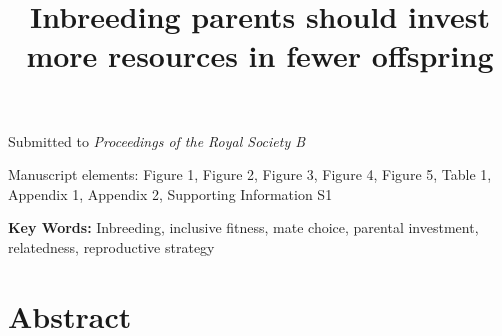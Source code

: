 \documentclass[12pt]{article}
\title{Inbreeding parents should invest more resources in fewer offspring}
\date{}
\begin{document}
\maketitle

\begin{center}
\vspace{5 mm}


\vspace{5 mm}


\vspace{15 mm}

\noindent Submitted to \emph{Proceedings of the Royal Society B}  

\vspace{15 mm} 

\noindent Manuscript elements: Figure 1, Figure 2, Figure 3, Figure 4, Figure 5, Table 1, Appendix 1, Appendix 2, Supporting Information S1 

\vspace{15 mm}

\noindent \textbf{Key Words:} Inbreeding, inclusive fitness, mate choice, parental investment, relatedness, reproductive strategy
\newline

\end{center}

\linenumbers
\modulolinenumbers[2]
\doublespacing

\clearpage

\section*{Abstract} 
\end{document}
